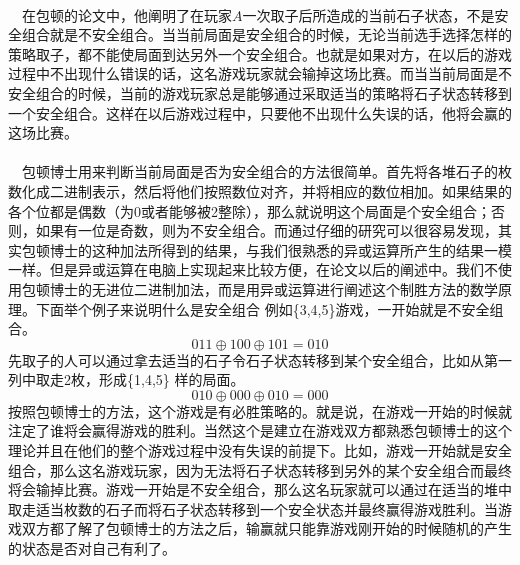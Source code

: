 \documentclass[UTF8,nofonts,cs4size]{ctexrep}
\begin{document}
\paragraph{}
\indent\ \
在包顿的论文中，他阐明了在玩家$A$一次取子后所造成的当前石子状态，不是安全组合就是不安全组合。当当前局面是安全组合的时候，无论当前选手选择怎样的策略取子，都不能使局面到达另外一个安全组合。也就是如果对方，在以后的游戏过程中不出现什么错误的话，这名游戏玩家就会输掉这场比赛。而当当前局面是不安全组合的时候，当前的游戏玩家总是能够通过采取适当的策略将石子状态转移到一个安全组合。这样在以后游戏过程中，只要他不出现什么失误的话，他将会赢的这场比赛。
\paragraph{}
\indent\ \
包顿博士用来判断当前局面是否为安全组合的方法很简单。首先将各堆石子的枚数化成二进制表示，然后将他们按照数位对齐，并将相应的数位相加。如果结果的各个位都是偶数（为0或者能够被2整除），那么就说明这个局面是个安全组合；否则，如果有一位是奇数，则为不安全组合。而通过仔细的研究可以很容易发现，其实包顿博士的这种加法所得到的结果，与我们很熟悉的异或运算所产生的结果一模一样。但是异或运算在电脑上实现起来比较方便，在论文以后的阐述中。我们不使用包顿博士的无进位二进制加法，而是用异或运算进行阐述这个制胜方法的数学原理。下面举个例子来说明什么是安全组合
例如\{3,4,5\}游戏，一开始就是不安全组合。
\begin{equation}
011\oplus 100 \oplus 101 = 010
\end{equation}
\indent
先取子的人可以通过拿去适当的石子令石子状态转移到某个安全组合，比如从第一列中取走2枚，形成\{1,4,5\}
样的局面。
\begin{equation}
010\oplus 000 \oplus 010 = 000
\end{equation}
\indent
按照包顿博士的方法，这个游戏是有必胜策略的。就是说，在游戏一开始的时候就注定了谁将会赢得游戏的胜利。当然这个是建立在游戏双方都熟悉包顿博士的这个理论并且在他们的整个游戏过程中没有失误的前提下。比如，游戏一开始就是安全组合，那么这名游戏玩家，因为无法将石子状态转移到另外的某个安全组合而最终将会输掉比赛。游戏一开始是不安全组合，那么这名玩家就可以通过在适当的堆中取走适当枚数的石子而将石子状态转移到一个安全状态并最终赢得游戏胜利。当游戏双方都了解了包顿博士的方法之后，输赢就只能靠游戏刚开始的时候随机的产生的状态是否对自己有利了。
\end{document}
